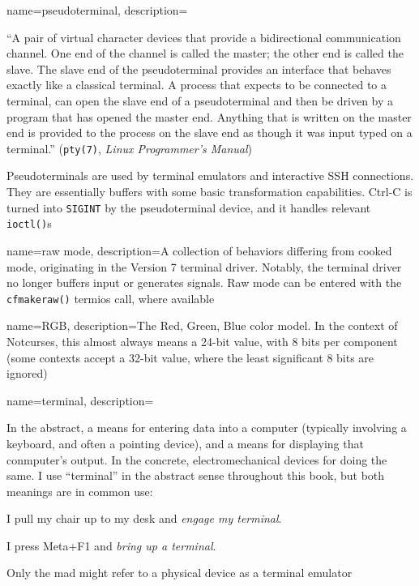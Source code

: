 {
  name={pseudoterminal},
description={``A pair of virtual character devices that provide a
  bidirectional communication channel. One end of the channel is called the
  master; the other end is called the slave. The slave end of the
  pseudoterminal provides an interface that behaves exactly like a classical
  terminal. A process that expects to be connected to a terminal, can open
  the slave end of a pseudoterminal and then be driven by a program that has
  opened the master end. Anything that is written on the master end is
  provided to the process on the slave end as though it was input typed on a
  terminal.'' (\texttt{pty(7)}, \textit{Linux Programmer's Manual})

 Pseudoterminals are used by terminal emulators and interactive SSH
  connections. They are essentially buffers with some basic transformation
  capabilities. Ctrl-C is turned into \texttt{SIGINT} by the pseudoterminal device,
  and it handles relevant \texttt{ioctl()}s}
}

{
  name={raw mode},
  description={A collection of behaviors differing from \gls{cooked mode},
   originating in the Version 7 terminal driver. Notably, the terminal driver no
   longer buffers input or generates signals. Raw mode can be entered with the
   \texttt{cfmakeraw()} termios call, where available}
}

{
  name={RGB},
  description={The Red, Green, Blue color model. In the context of Notcurses,
    this almost always means a 24-bit value, with 8 bits per component (some
    contexts accept a 32-bit value, where the least significant 8 bits are
    ignored)}
}

{
  name={terminal},
description={In the abstract, a means for entering data into a computer
  (typically involving a keyboard, and often a pointing device), and a means
  for displaying that conmputer's output. In the concrete, electromechanical
  devices for doing the same. I use ``terminal'' in the abstract sense
  throughout this book, but both meanings are in common use:

  \begin{denseitemize}
  \item I pull my chair up to my desk and \textit{engage my terminal}.
  \item I press Meta+F1 and \textit{bring up a terminal}.
  \end{denseitemize}

 Only the mad might refer to a physical device as a terminal emulator}
}

